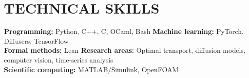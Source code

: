 \documentclass[10pt,a4paper]{article}
\begin{document}
\section{TECHNICAL SKILLS}
\textbf{Programming:} Python, C++, C, OCaml, Bash \quad
\textbf{Machine learning:} PyTorch, Diffusers, TensorFlow\\[2pt]
\textbf{Formal methods:} Lean \quad
\textbf{Research areas:} Optimal transport, diffusion models, computer vision, time-series analysis\\[2pt]
\textbf{Scientific computing:} MATLAB/Simulink, OpenFOAM
\end{document}
